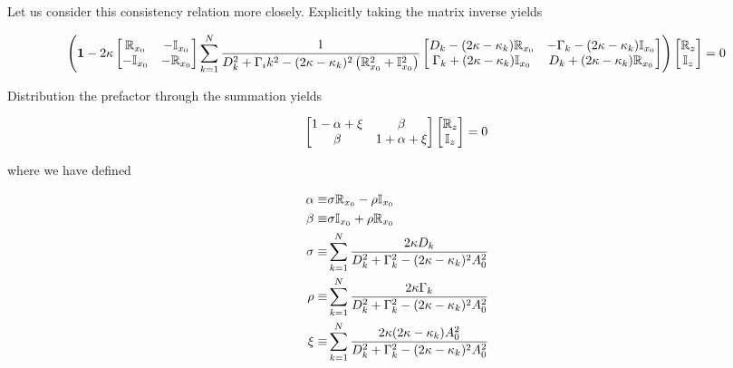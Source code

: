 Let us consider this consistency relation more closely. Explicitly taking the matrix inverse yields

\begin{equation}
\left(\mathbf{1} - 2\kappa
\begin{bmatrix}
\mathbb{R}_{x_0} & -\mathbb{I}_{x_0} \\
-\mathbb{I}_{x_0} & -\mathbb{R}_{x_0} \\
\end{bmatrix}
\sum_{k=1}^{N}
\frac{1}{D_k^2 + \Gamma_ik^2 - (2\kappa -\kappa_k)^2 \left(\mathbb{R}_{x_0}^2 + \mathbb{I}_{x_0}^2\right)}
\begin{bmatrix}
D_k - (2\kappa -\kappa_k)\mathbb{R}_{x_0}        & - \Gamma_k - (2\kappa - \kappa_k)\mathbb{I}_{x_0} \\
\Gamma_k + (2\kappa - \kappa_k)\mathbb{I}_{x_0}  & D_k + (2\kappa -\kappa_k)\mathbb{R}_{x_0} \\
\end{bmatrix}
\right)
\begin{bmatrix}
\mathbb{R}_{z} \\
\mathbb{I}_{z} \\
\end{bmatrix}
= 0
\end{equation}

Distribution the prefactor through the summation yields

\begin{equation}
\begin{bmatrix}
1 - \alpha + \xi & \beta \\
\beta            & 1 + \alpha + \xi \\
\end{bmatrix}
\begin{bmatrix}
\mathbb{R}_{z} \\
\mathbb{I}_{z} \\
\end{bmatrix}
= 0
\end{equation}

where we have defined

\begin{subequations}
\begin{align}
\alpha\equiv & \sigma \mathbb{R}_{x_0} - \rho \mathbb{I}_{x_0} \\
\beta\equiv  & \sigma \mathbb{I}_{x_0} + \rho \mathbb{R}_{x_0} \\
\sigma\equiv & \sum_{k=1}^N \frac{2\kappa D_k}{D_k^2 + \Gamma_k^2 - (2\kappa - \kappa_k)^2 A_{0}^2} \\
\rho\equiv   & \sum_{k=1}^N \frac{2\kappa \Gamma_k}{D_k^2 + \Gamma_k^2 - (2\kappa - \kappa_k)^2 A_{0}^2} \\
\xi\equiv    & \sum_{k=1}^N \frac{2\kappa (2\kappa-\kappa_k) A_0^2}{D_k^2 + \Gamma_k^2 - (2\kappa - \kappa_k)^2 A_{0}^2}
\end{align}
\end{subequations}

